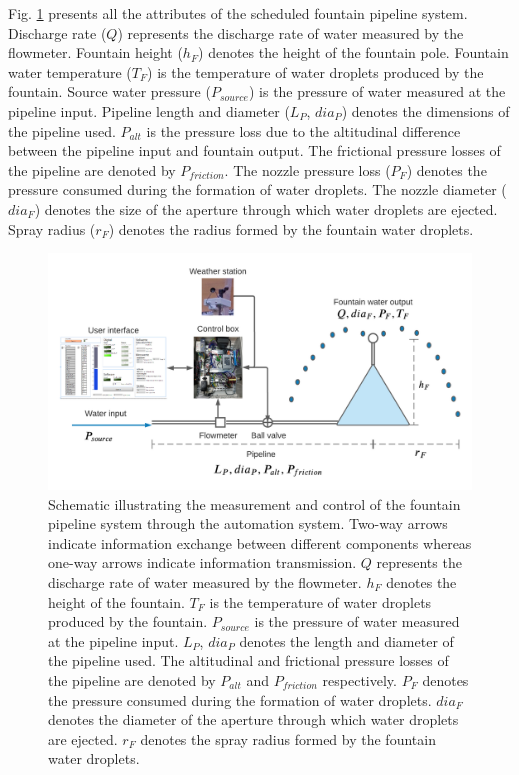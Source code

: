 \documentclass[tc, manuscript]{copernicus}
\begin{document}
Fig. \ref{fig:auto_schematic} presents all the attributes of the scheduled fountain pipeline system. Discharge
rate ($Q$) represents the discharge rate of water measured by the flowmeter. Fountain height ($h_F$) denotes the
height of the fountain pole. Fountain water temperature ($T_F$) is the temperature of water droplets produced by the
fountain. Source water pressure ($P_{source}$) is the pressure of water measured at the pipeline input. Pipeline
length and diameter ($L_P$, $dia_P$) denotes the dimensions of the pipeline used. $P_{alt}$ is the pressure loss
due to the altitudinal difference between the pipeline input and fountain output. The frictional pressure losses
of the pipeline are denoted by $P_{friction}$. The nozzle pressure loss ($P_{F}$) denotes the pressure consumed
during the formation of water droplets. The nozzle diameter ($dia_{F}$) denotes the size of the aperture through
which water droplets are ejected. Spray radius ($r_{F}$) denotes the radius formed by the fountain water
droplets.

\begin{figure}
\includegraphics[width=\linewidth]{Figures/Automation_schematic.png}
\caption{Schematic illustrating the measurement and control of the fountain pipeline system through the
  automation system. Two-way arrows indicate information exchange between different components whereas one-way
  arrows indicate information transmission. $Q$ represents the discharge rate of water measured by the
  flowmeter. $h_F$ denotes the height of the fountain. $T_F$ is the temperature of water droplets produced by
  the fountain. $P_{source}$ is the pressure of water measured at the pipeline input. $L_P$, $dia_P$ denotes the
  length and diameter of the pipeline used. The altitudinal and frictional pressure losses of the pipeline are
  denoted by $P_{alt}$ and $P_{friction}$ respectively. $P_{F}$ denotes the pressure consumed during the
  formation of water droplets. $dia_{F}$ denotes the diameter of the aperture through which water droplets are
  ejected. $r_{F}$ denotes the spray radius formed by the fountain water droplets. }

\label{fig:auto_schematic} 
\end{figure}
\end{document}
